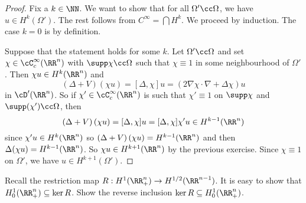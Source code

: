 \begin{proof}
  Fix a $k\in\NN$.
  We want to show that for all $\Omega'\cc\Omega$, we have $u\in H^k(\Omega')$.
  The rest follows from $C^\infty=\bigcap H^k$.
  We proceed by induction.
  The case $k=0$ is by definition.

  Suppose that the statement holds for some $k$.
  Let $\Omega'\cc\Omega$ and set $\chi\in\cC_c^\infty(\RR^n)$ with $\supp\chi\cc\Omega$ such that $\chi\equiv1$ in some neighbourhood of $\Omega'$.
  Then $\chi u\in H^k(\RR^n)$ and
  \[ \left( \Delta+V \right)(\chi u) = [\Delta,\chi]u = \left( 2\nabla\chi\cdot\nabla+\Delta\chi \right)u \]
  in $\cD'(\RR^n)$.
  So if $\chi'\in\cC_c^\infty(\RR^n)$ is such that $\chi'\equiv1$ on $\supp\chi$ and $\supp(\chi')\cc\Omega$, then
  \[ \left( \Delta+V \right)(\chi u) = [\Delta,\chi]u = [\Delta,\chi]\chi'u \in H^{k-1}(\RR^n) \]
  since $\chi'u\in H^k(\RR^n)$ so $\left( \Delta+V \right)(\chi u)= H^{k-1}(\RR^n)$ and then $\Delta(\chi u)= H^{k-1}(\RR^n)$.
  So $\chi u\in H^{k+1}(\RR^n)$ by the previous exercise.
  Since $\chi\equiv1$ on $\Omega'$, we have $u\in H^{k+1}(\Omega')$.
\end{proof}

\begin{exer}
  Recall the restriction map $R: H^1(\RR_+^n) \to H^{1/2}(\RR^{n-1})$.
  It is easy to show that $H_0^1(\RR_+^n)\subseteq\ker R$.
  Show the reverse inclusion $\ker R\subseteq H_0^1(\RR_+^n)$.
\end{exer}

